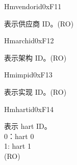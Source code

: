 \begin{register}{H}{mvendorid}{0xF11}\label{regdesc:MVENDORID}
%
\regnewline%
\begin{regdesc}\begin{reglist}
\label{fielddesc:MVENDORID}\item [MVENDORID] 表示供应商 ID。(RO)
\end{reglist}\end{regdesc}
\end{register}

\begin{register}{H}{marchid}{0xF12}\label{regdesc:MARCHID}
%
\regnewline%
\begin{regdesc}\begin{reglist}
\label{fielddesc:MARCHID}\item [MARCHID] 表示架构 ID。(RO)
\end{reglist}\end{regdesc}
\end{register}

\begin{register}{H}{mimpid}{0xF13}\label{regdesc:MIMPID}
%
\regnewline%
\begin{regdesc}\begin{reglist}
\label{fielddesc:MIMPID}\item [MIMPID] 表示实现 ID。(RO)
\end{reglist}\end{regdesc}
\end{register}

\begin{register}{H}{mhartid}{0xF14}\label{regdesc:MHARTID}
%
\regnewline%
\begin{regdesc}\begin{reglist}
\label{fielddesc:MHARTID}\item [MHARTID] 表示 hart ID。\\
0：hart 0\\
1: hart 1\\
(RO)
\end{reglist}\end{regdesc}
\end{register}

